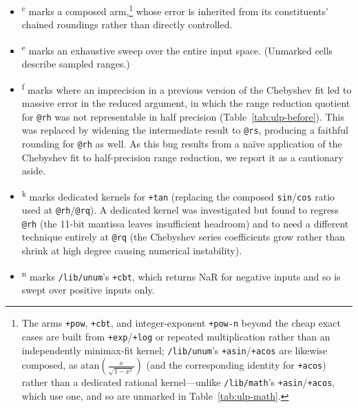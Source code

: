 \documentclass[twoside]{article}
\begin{document}
\begin{itemize}
  \item \textsuperscript{c} marks a composed arm,\footnote{The arms \texttt{+pow}, \texttt{+cbt}, and integer-exponent \texttt{+pow-n} beyond the cheap exact cases are built from \texttt{+exp}/\texttt{+log} or repeated multiplication rather than an independently minimax-fit kernel; \texttt{/lib/unum}'s \texttt{+asin}/\texttt{+acos} are likewise composed, as $\mathrm{atan}(\frac{x}{\sqrt{\text{1}-x^\text{2}}})$ (and the corresponding identity for \texttt{+acos}) rather than a dedicated rational kernel---unlike \texttt{/lib/math}'s \texttt{+asin}/\texttt{+acos}, which use one, and so are unmarked in Table~\ref{tab:ulp-math}.} whose error is inherited from its constituents' chained roundings rather than directly controlled.
  \item \textsuperscript{e} marks an exhaustive sweep over the entire input space.  (Unmarked cells describe sampled ranges.)
  \item \textsuperscript{f} marks where an imprecision in a previous version of the Chebyshev fit led to massive error in the reduced argument, in which the range reduction quotient for \texttt{@rh} was not representable in half precision (Table~\ref{tab:ulp-before}).  This was replaced by widening the intermediate result to \texttt{@rs}, producing a faithful rounding for \texttt{@rh} as well.  As this bug results from a na\"{i}ve application of the Chebyshev fit to half-precision range reduction, we report it as a cautionary aside.
  \item \textsuperscript{k} marks dedicated kernels for \texttt{+tan} (replacing the composed \texttt{sin}/\texttt{cos} ratio used at \texttt{@rh}/\texttt{@rq}).  A dedicated kernel was investigated but found to regress \texttt{@rh} (the 11-bit mantissa leaves insufficient headroom) and to need a different technique entirely at \texttt{@rq} (the Chebyshev series coefficients grow rather than shrink at high degree causing numerical instability).
  \item \textsuperscript{n} marks \texttt{/lib/unum}'s \texttt{+cbt}, which returns NaR for negative inputs and so is swept over positive inputs only.
\end{itemize}
\end{document}
